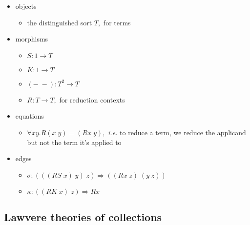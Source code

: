 \documentclass[submission,copyright,creativecommons]{eptcs}
\newcommand{\maps}{\colon}
\begin{document}
\begin{itemize}
  \item objects
    \begin{itemize}
      \item the distinguished sort $T,$ for terms
    \end{itemize}
  \item morphisms
    \begin{itemize}
      \item $S\maps 1 \to T$
      \item $K\maps 1 \to T$
      \item $(-\; -)\maps T^2 \to T$
      \item $R\maps T \to T,$ for reduction contexts
    \end{itemize}
  \item equations
    \begin{itemize}
      \item $\forall xy.R(x\; y) = (Rx\; y),$ {\em i.e.} to reduce a term, we reduce the applicand but not the term it's applied to
    \end{itemize}
  \item edges
    \begin{itemize}
      \item $\sigma\maps (((RS\; x)\; y)\; z) \Rightarrow ((Rx\; z)\; (y\; z))$
      \item $\kappa\maps ((RK\; x)\; z) \Rightarrow Rx$
    \end{itemize}
\end{itemize}


\subsection{Lawvere theories of collections}
\end{document}
